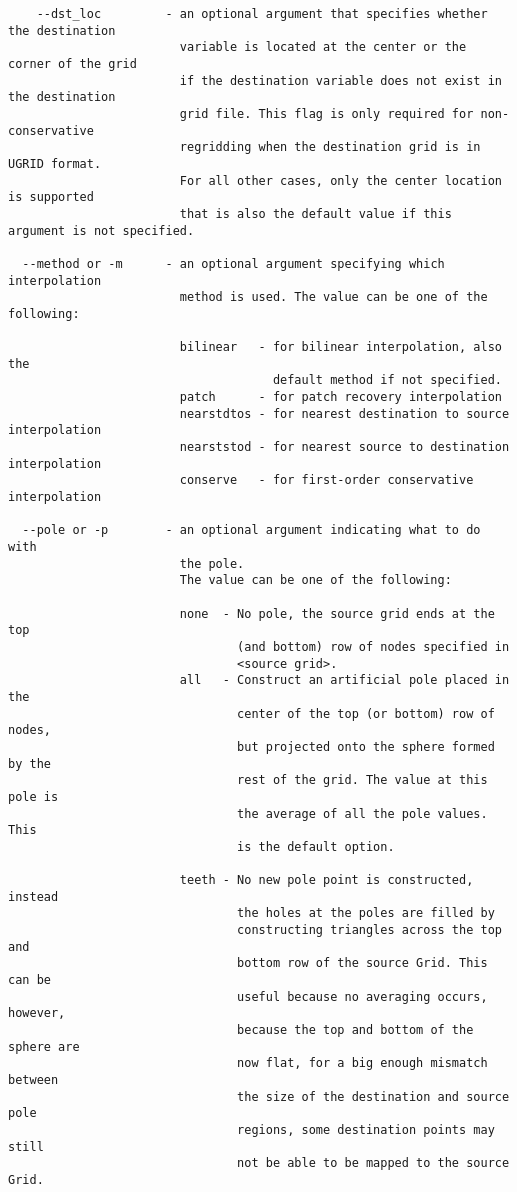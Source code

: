 \begin{verbatim}
    --dst_loc         - an optional argument that specifies whether the destination
                        variable is located at the center or the corner of the grid
                        if the destination variable does not exist in the destination
                        grid file. This flag is only required for non-conservative
                        regridding when the destination grid is in UGRID format.
                        For all other cases, only the center location is supported
                        that is also the default value if this argument is not specified.

  --method or -m      - an optional argument specifying which interpolation
                        method is used. The value can be one of the following:

                        bilinear   - for bilinear interpolation, also the
                                     default method if not specified.
                        patch      - for patch recovery interpolation
                        nearstdtos - for nearest destination to source interpolation
                        nearststod - for nearest source to destination interpolation
                        conserve   - for first-order conservative interpolation

  --pole or -p        - an optional argument indicating what to do with
                        the pole.
                        The value can be one of the following:

                        none  - No pole, the source grid ends at the top
                                (and bottom) row of nodes specified in
                                <source grid>.
                        all   - Construct an artificial pole placed in the
                                center of the top (or bottom) row of nodes,
                                but projected onto the sphere formed by the
                                rest of the grid. The value at this pole is
                                the average of all the pole values. This
                                is the default option.

                        teeth - No new pole point is constructed, instead
                                the holes at the poles are filled by
                                constructing triangles across the top and
                                bottom row of the source Grid. This can be
                                useful because no averaging occurs, however,
                                because the top and bottom of the sphere are
                                now flat, for a big enough mismatch between
                                the size of the destination and source pole
                                regions, some destination points may still
                                not be able to be mapped to the source Grid.


\end{verbatim}

